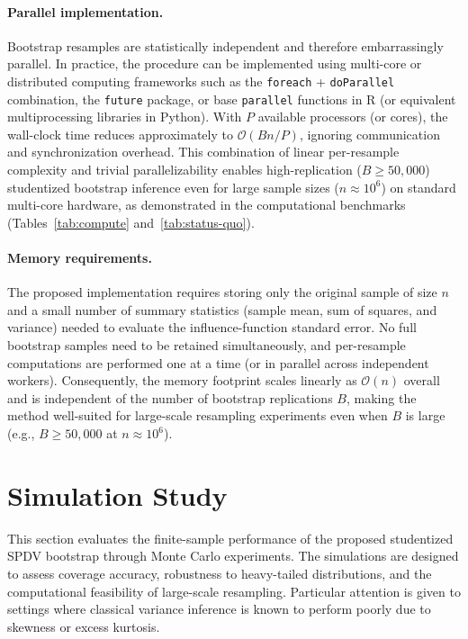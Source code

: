 \documentclass[12pt,a4paper]{article}
\begin{document}
\paragraph{Parallel implementation.}
Bootstrap resamples are statistically independent and therefore embarrassingly parallel. In practice, the procedure can be implemented using multi-core or distributed computing frameworks such as the \texttt{foreach} + \texttt{doParallel} combination, the \texttt{future} package, or base \texttt{parallel} functions in R (or equivalent multiprocessing libraries in Python). With $P$ available processors (or cores), the wall-clock time reduces approximately to $\mathcal{O}(Bn/P)$, ignoring communication and synchronization overhead. This combination of linear per-resample complexity and trivial parallelizability enables high-replication ($B \ge 50{,}000$) studentized bootstrap inference even for large sample sizes ($n \approx 10^6$) on standard multi-core hardware, as demonstrated in the computational benchmarks (Tables~\ref{tab:compute} and~\ref{tab:status-quo}).

\paragraph{Memory requirements.}
The proposed implementation requires storing only the original sample of size $n$ and a small number of summary statistics (sample mean, sum of squares, and variance) needed to evaluate the influence-function standard error. No full bootstrap samples need to be retained simultaneously, and per-resample computations are performed one at a time (or in parallel across independent workers). Consequently, the memory footprint scales linearly as $\mathcal{O}(n)$ overall and is independent of the number of bootstrap replications $B$, making the method well-suited for large-scale resampling experiments even when $B$ is large (e.g., $B \ge 50{,}000$ at $n \approx 10^6$).



\section{Simulation Study}
\label{sec:simulation}

This section evaluates the finite-sample performance of the proposed studentized SPDV bootstrap through Monte Carlo experiments. The simulations are designed to assess coverage accuracy, robustness to heavy-tailed distributions, and the computational feasibility of large-scale resampling. Particular attention is given to settings where classical variance inference is known to perform poorly due to skewness or excess kurtosis.
\end{document}
